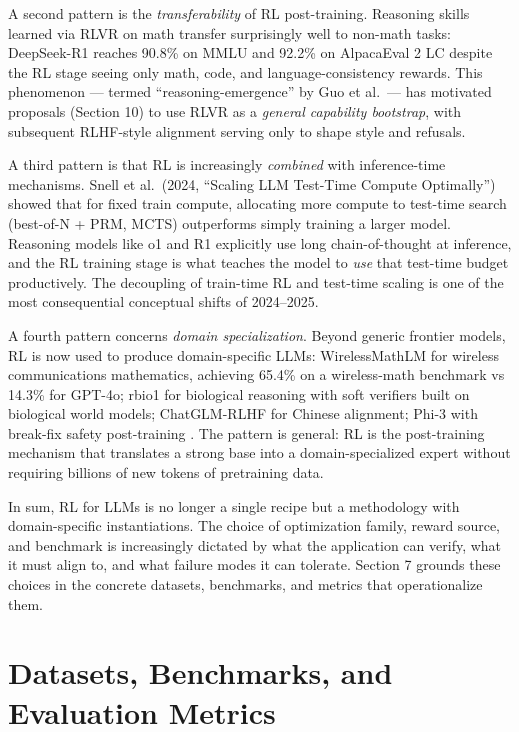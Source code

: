 \documentclass{article}
\begin{document}
A second pattern is the \emph{transferability} of RL post-training. Reasoning skills learned via RLVR on math transfer surprisingly well to non-math tasks: DeepSeek-R1 reaches 90.8\% on MMLU and 92.2\% on AlpacaEval 2 LC despite the RL stage seeing only math, code, and language-consistency rewards. This phenomenon --- termed ``reasoning-emergence'' by Guo et al.~--- has motivated proposals (Section 10) to use RLVR as a \emph{general capability bootstrap}, with subsequent RLHF-style alignment serving only to shape style and refusals.

A third pattern is that RL is increasingly \emph{combined} with inference-time mechanisms. Snell et al.~(2024, ``Scaling LLM Test-Time Compute Optimally'') showed that for fixed train compute, allocating more compute to test-time search (best-of-N + PRM, MCTS) outperforms simply training a larger model. Reasoning models like o1 and R1 explicitly use long chain-of-thought at inference, and the RL training stage is what teaches the model to \emph{use} that test-time budget productively. The decoupling of train-time RL and test-time scaling is one of the most consequential conceptual shifts of 2024--2025.

A fourth pattern concerns \emph{domain specialization}. Beyond generic frontier models, RL is now used to produce domain-specific LLMs: WirelessMathLM \citep{li20252025} for wireless communications mathematics, achieving 65.4\% on a wireless-math benchmark vs 14.3\% for GPT-4o; rbio1 \citep{istrate20252025} for biological reasoning with soft verifiers built on biological world models; ChatGLM-RLHF \citep{hou20242024} for Chinese alignment; Phi-3 with break-fix safety post-training \citep{haider20242024}. The pattern is general: RL is the post-training mechanism that translates a strong base into a domain-specialized expert without requiring billions of new tokens of pretraining data.

In sum, RL for LLMs is no longer a single recipe but a methodology with domain-specific instantiations. The choice of optimization family, reward source, and benchmark is increasingly dictated by what the application can verify, what it must align to, and what failure modes it can tolerate. Section 7 grounds these choices in the concrete datasets, benchmarks, and metrics that operationalize them.

\section{Datasets, Benchmarks, and Evaluation Metrics}\label{datasets-benchmarks-and-evaluation-metrics}
\end{document}
